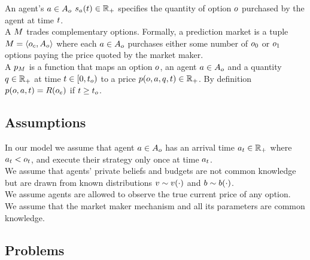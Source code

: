 An agent's $a\in A_o$  
$s_a(t) \in \mathbb{R}_+$ specifies the quantity of option 
$o$ purchased by the agent at time $t$.\\

A  $M$ trades complementary options. 
Formally, a prediction market is a tuple $M = 
\left<o_c, A_o \right>$ where each  
$a\in A_o$ purchases 
either some number of $o_0$ or $o_1$ options paying the price quoted by the 
market maker.\\


A  $p_M$ is a function 
that maps an option $o$, an agent $a \in A_o$ 
and a quantity $q\in\mathbb{R}_+$ at time $t \in [0,t_o)$ 
to a price $p(o,a,q,t) \in \mathbb{R}_+$. 
By definition $p(o,a, t) = R(o_e)$ if 
$t \ge t_o$.

\subsection{Assumptions}

In our model we assume that agent $a \in A_o$ has an arrival time 
$a_t \in \mathbb{R}_+$ where $a_t < o_t$, 
and execute their strategy only once at time $a_t$.\\

We assume that agents' private beliefs and budgets are not common knowledge
but are drawn from known distributions $v \sim v(\cdot)$ and
$b \sim b(\cdot)$.\\

We assume agents are allowed to observe the true current price of any option.\\

We assume that the market maker mechanism and all its parameters are common knowledge.\\


\subsection{Problems}
  
